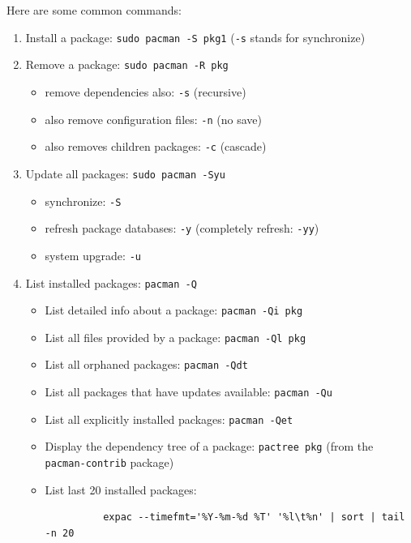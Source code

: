     Here are some common commands: 
    \begin{enumerate}
      \item Install a package: \texttt{sudo pacman -S pkg1} (\texttt{-s} stands for synchronize)

      \item Remove a package: \texttt{sudo pacman -R pkg}
      \begin{itemize}
        \item remove dependencies also: \texttt{-s} (recursive)
        \item also remove configuration files: \texttt{-n} (no save)
        \item also removes children packages: \texttt{-c} (cascade)
      \end{itemize}

      \item Update all packages: \texttt{sudo pacman -Syu}
      \begin{itemize}
        \item synchronize: \texttt{-S}
        \item refresh package databases: \texttt{-y} (completely refresh: \texttt{-yy})
        \item system upgrade: \texttt{-u}
      \end{itemize}

      \item List installed packages: \texttt{pacman -Q}
      \begin{itemize}
        \item List detailed info about a package: \texttt{pacman -Qi pkg}
        \item List all files provided by a package: \texttt{pacman -Ql pkg}
        \item List all orphaned packages: \texttt{pacman -Qdt}
        \item List all packages that have updates available: \texttt{pacman -Qu}
        \item List all explicitly installed packages: \texttt{pacman -Qet}
        \item Display the dependency tree of a package: \texttt{pactree pkg} (from the \texttt{pacman-contrib} package) 
        \item List last 20 installed packages: 
        \begin{lstlisting}
          expac --timefmt='%Y-%m-%d %T' '%l\t%n' | sort | tail -n 20
        \end{lstlisting}
      \end{itemize}


\end{enumerate}
